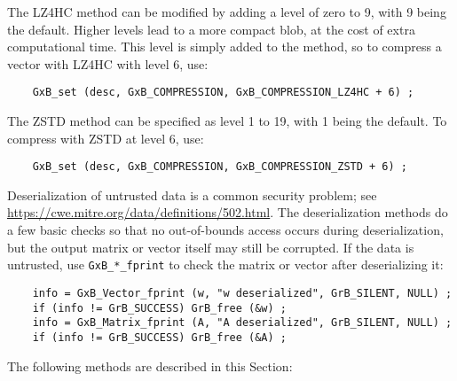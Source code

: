 \documentclass[12pt]{article}
\begin{document}
The LZ4HC method can be modified by adding a level of zero to 9, with 9 being
the default.  Higher levels lead to a more compact blob, at the cost of extra
computational time. This level is simply added to the method, so to compress a
vector with LZ4HC with level 6, use:

    {\footnotesize
    \begin{verbatim}
    GxB_set (desc, GxB_COMPRESSION, GxB_COMPRESSION_LZ4HC + 6) ; \end{verbatim}}

The ZSTD method can be specified as level 1 to 19, with 1 being the default.
To compress with ZSTD at level 6, use:

    {\footnotesize
    \begin{verbatim}
    GxB_set (desc, GxB_COMPRESSION, GxB_COMPRESSION_ZSTD + 6) ; \end{verbatim}}

Deserialization of untrusted data is a common security problem; see
\url{https://cwe.mitre.org/data/definitions/502.html}. The deserialization
methods do a few basic checks so that no out-of-bounds access occurs during
deserialization, but the output matrix or vector itself may still be corrupted.
If the data is untrusted, use \verb'GxB_*_fprint' to
check the matrix or vector after deserializing it:

{\footnotesize
\begin{verbatim}
    info = GxB_Vector_fprint (w, "w deserialized", GrB_SILENT, NULL) ;
    if (info != GrB_SUCCESS) GrB_free (&w) ;
    info = GxB_Matrix_fprint (A, "A deserialized", GrB_SILENT, NULL) ;
    if (info != GrB_SUCCESS) GrB_free (&A) ; \end{verbatim}}

The following methods are described in this Section:
\end{document}
